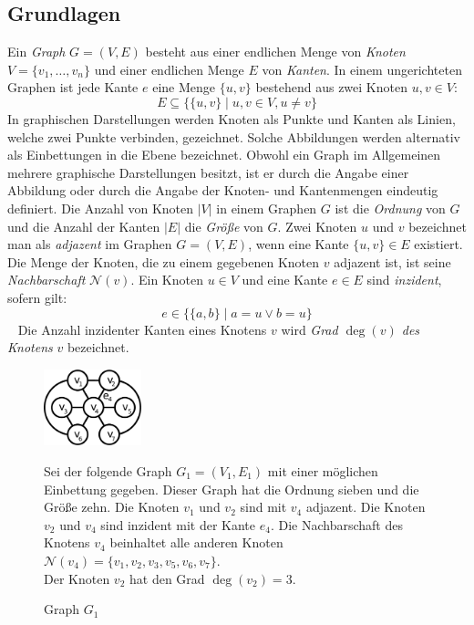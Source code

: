 \subsection{Grundlagen}
Ein \emph{Graph} $G = (V, E)$ besteht aus einer endlichen Menge von \emph{Knoten} $V = \{v_1 ,\ldots, v_n\}$ und einer endlichen Menge $E$ von \emph{Kanten}. In einem ungerichteten Graphen ist jede Kante $e$ eine Menge $\{u, v\}$ bestehend aus zwei Knoten $u, v \in V$:\vspace{-1mm}
$$E \subseteq \{\{u, v\}\; |\; u, v \in V, u \neq v\}$$
In graphischen Darstellungen werden Knoten als Punkte und Kanten als Linien, welche zwei Punkte verbinden, gezeichnet. Solche Abbildungen werden alternativ als Einbettungen in die Ebene bezeichnet. Obwohl ein Graph im Allgemeinen mehrere graphische Darstellungen besitzt, ist er durch die Angabe einer Abbildung oder durch die Angabe der Knoten- und Kantenmengen eindeutig definiert.\vspace{-1mm}\newline\newline
Die Anzahl von Knoten $|V|$ in einem Graphen $G$ ist die \emph{Ordnung} von $G$ und die Anzahl der Kanten $|E|$ die \emph{Größe} von $G$. Zwei Knoten $u$ und $v$ bezeichnet man als \emph{adjazent} im Graphen $G=(V,E)$, wenn eine Kante $\{u, v\} \in E$ existiert.\\Die Menge der Knoten, die zu einem gegebenen Knoten $v$ adjazent ist, ist seine \emph{Nachbarschaft} $\mathcal{N}(v)$. Ein Knoten $u \in V$ und eine Kante $e \in E$ sind \emph{inzident}, sofern gilt: \vspace{-1mm} $$e \in \{\{a,b\}\;|\;a=u \vee b=u\}$$ \vspace{-4mm}~\linebreak
Die Anzahl inzidenter Kanten eines Knotens $v$ wird \emph{Grad $\deg(v)$ des Knotens} $v$ bezeichnet.\\
\vspace{-8mm}
\begin{figure}
\begin{minipage}{145pt}
\centering
\includegraphics*[width = 80pt]{bilder/bsp2,1.pdf}
\label{bild:bsp1}
\caption{Graph $G_1$}
\end{minipage}
\begin{minipage}{280pt}
Sei der folgende Graph $G_1=(V_1,E_1)$ mit einer möglichen Einbettung gegeben.
Dieser Graph hat die Ordnung sieben und die Größe zehn. Die Knoten $v_1$ und $v_2$ sind mit $v_4$ adjazent. Die Knoten $v_2$ und $v_4$ sind inzident mit der Kante $e_4$. Die Nachbarschaft des Knotens $v_4$ beinhaltet alle anderen Knoten $\mathcal{N}(v_4)=\{v_1,v_2,v_3,v_5,v_6,v_7\}$.\\Der Knoten $v_2$ hat den Grad $\deg(v_2)=3$. 
\end{minipage}
\end{figure}
